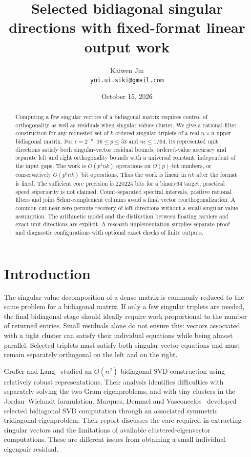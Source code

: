 \documentclass[11pt]{article}
\title{Selected bidiagonal singular directions with fixed-format linear output work}
\author{Kaiwen Jin\\\small\texttt{yui.ui.siki@gmail.com}}
\date{October 15, 2026}
\theoremstyle{remark}\newtheorem{remark}[theorem]{Remark}
\begin{document}
\maketitle
\begin{abstract}
Computing a few singular vectors of a bidiagonal matrix requires control of
orthogonality as well as residuals when singular values cluster. We give a
rational-filter construction for any requested set of $k$ ordered singular
triplets of a real $n\times n$ upper bidiagonal matrix. For
$\epsilon=2^{-p}$, $16\le p\le53$ and $n\epsilon\le1/64$, its represented
unit directions satisfy both singular-vector residual bounds, ordered-value
accuracy and separate left and right orthogonality bounds with a universal
constant, independent of the input gaps. The work is $O(p^4nk)$ operations on
$O(p)$-bit numbers, or conservatively $O(p^6nk)$ bit operations. Thus the work
is linear in $nk$ after the format is fixed. The sufficient core precision is
220224 bits for a binary64 target; practical speed superiority is not claimed.
Count-separated spectral intervals, positive rational filters and joint
Schur-complement columns avoid a final vector reorthogonalization. A common
cut near zero permits recovery of left directions without a small-singular-value
assumption. The arithmetic model and the distinction between floating carriers
and exact unit directions are explicit. A research implementation supplies
separate proof and diagnostic configurations with optional exact checks of
finite outputs.
\end{abstract}

\section{Introduction}
The singular value decomposition of a dense matrix is commonly reduced to the
same problem for a bidiagonal matrix. If only a few singular triplets are
needed, the final bidiagonal stage should ideally require work proportional
to the number of returned entries. Small residuals alone do not ensure this:
vectors associated with a tight cluster can satisfy their individual equations
while being almost parallel. Selected triplets must satisfy both singular-vector
equations and must remain separately orthogonal on the left and on the right.

Gro{\ss}er and Lang~\cite{GL} studied an $O(n^2)$ bidiagonal SVD construction
using relatively robust representations. Their analysis identifies difficulties
with separately solving the two Gram eigenproblems, and with tiny clusters
in the Jordan--Wielandt formulation. Marques, Demmel and
Vasconcelos~\cite{MDV} developed selected bidiagonal SVD computation through
an associated symmetric tridiagonal eigenproblem. Their report discusses
the care required in extracting singular vectors and the limitations of
available clustered-eigenvector computations. These are different issues from
obtaining a small individual eigenpair residual.
\end{document}
